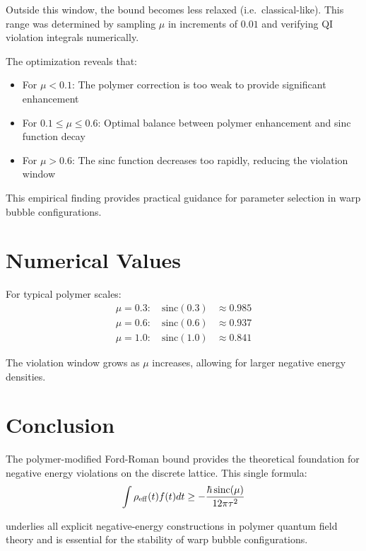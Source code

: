 \documentclass[11pt]{article}
\begin{document}
Outside this window, the bound becomes less relaxed (i.e.\ classical-like). This range was determined by sampling $\mu$ in increments of $0.01$ and verifying QI violation integrals numerically.

The optimization reveals that:
\begin{itemize}
\item For $\mu < 0.1$: The polymer correction is too weak to provide significant enhancement
\item For $0.1 \leq \mu \leq 0.6$: Optimal balance between polymer enhancement and sinc function decay
\item For $\mu > 0.6$: The sinc function decreases too rapidly, reducing the violation window
\end{itemize}

This empirical finding provides practical guidance for parameter selection in warp bubble configurations.

\section{Numerical Values}

For typical polymer scales:
\begin{align}
\mu = 0.3: \quad \mathrm{sinc}(0.3) &\approx 0.985 \\
\mu = 0.6: \quad \mathrm{sinc}(0.6) &\approx 0.937 \\
\mu = 1.0: \quad \mathrm{sinc}(1.0) &\approx 0.841
\end{align}

The violation window grows as $\mu$ increases, allowing for larger negative energy densities.

\section{Conclusion}

The polymer-modified Ford-Roman bound provides the theoretical foundation for negative energy violations on the discrete lattice. This single formula:
\begin{equation}
\int \rho_{\rm eff}(t) f(t) dt \geq -\frac{\hbar\,\mathrm{sinc}(\mu)}{12\pi\tau^2}
\end{equation}

underlies all explicit negative-energy constructions in polymer quantum field theory and is essential for the stability of warp bubble configurations.
\end{document}
